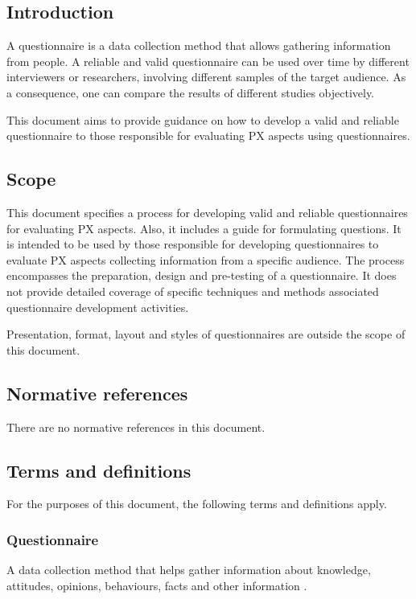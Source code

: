 \label{sec:sta_proposal}

\subsection{Introduction}
A questionnaire is a data collection method that allows gathering information from people. A reliable and valid questionnaire can be used over time by different interviewers or researchers, involving different samples of the target audience. As a consequence, one can compare the results of different studies objectively.

This document aims to provide guidance on how to develop a valid and reliable questionnaire to those responsible for evaluating \ac{PX} aspects using questionnaires.

\subsection{Scope}

This document specifies a process for developing valid and reliable questionnaires for evaluating \ac{PX} aspects. Also, it includes a guide for formulating questions. It is intended to be used by those responsible for developing questionnaires to evaluate \ac{PX} aspects collecting information from a specific audience. The process encompasses the preparation, design and pre-testing of a questionnaire. It does not provide detailed coverage of specific techniques and methods associated questionnaire development activities.

Presentation, format, layout and styles of questionnaires are outside the scope of this document.

\subsection{Normative references}
There are no normative references in this document.

\subsection{Terms and definitions}
For the purposes of this document, the following terms and definitions apply.

\subsubsection{Questionnaire}
A data collection method that helps gather information about knowledge, attitudes, opinions, behaviours, facts and other information \cite{Radhakrishna2007}.

